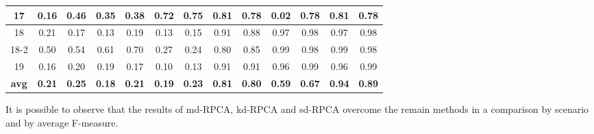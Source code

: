 \documentclass[review]{elsarticle}
\begin{document}
\begin{table}[h!]
\begin{tabular}{ c|c c|c c|c c|c c|c c|c c }
		17 & 0.16 & 0.46 & 0.35 & 0.38 & 0.72 & 0.75 & 0.81 & 0.78 & 0.02 & 0.78 & 0.81 & 0.78 \\ \hline
		18 & 0.21 & 0.17 & 0.13 & 0.19 & 0.13 & 0.15 & 0.91 & 0.88 & 0.97 & 0.98 & 0.97 & 0.98 \\ \hline
		18-2 & 0.50 & 0.54 & 0.61 & 0.70 & 0.27 & 0.24 & 0.80 & 0.85 & 0.99 & 0.98 & 0.99 & 0.98 \\ \hline
		19 & 0.16 & 0.20 & 0.19 & 0.17 & 0.10 & 0.13 & 0.91 & 0.91 & 0.96 & 0.99 & 0.96 & 0.99 \\ \hline
		\rowcolor{Gray} \textbf{avg} &\textbf{0.21} &\textbf{0.25} &\textbf{0.18} & \textbf{0.21} & \textbf{0.19} &\textbf{0.23} &\textbf{0.81} &\textbf{0.80} &\textbf{0.59} &\textbf{0.67} &\textbf{0.94} &\textbf{0.89} \\
    \bottomrule
  \end{tabular}
\end{table}

It is possible to observe that the results of md-RPCA, kd-RPCA and sd-RPCA overcome the remain methods in a comparison by scenario and by average F-measure. 


\end{document}
